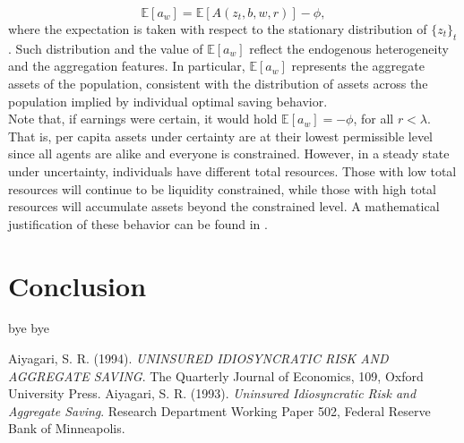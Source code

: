 \documentclass[12pt]{article}
\begin{document}
\begin{equation}
\mathbb E\left[a_w \right] = \mathbb E \left[A(z_t, b, w, r)\right] - \phi,
\end{equation}
where the expectation is taken with respect to the stationary distribution of $\{z_t\}_t$. Such distribution and the value of $\mathbb E\left[a_w \right]$ reflect the endogenous heterogeneity and the aggregation features. In particular, $\mathbb E\left[a_w \right]$ represents the aggregate assets of the population, consistent with the distribution of assets across the population implied by individual optimal saving behavior. \\
Note that, if earnings were certain, it would hold $\mathbb E\left[a_w \right] = -\phi$, for all $r < \lambda$. That is, per capita assets under certainty are at their lowest permissible level since all agents are alike and everyone is constrained. However, in a steady state under uncertainty, individuals have different total resources. Those with low total resources will continue to be liquidity constrained, while those with high total resources will accumulate assets beyond the constrained level. A mathematical justification of these behavior can be found in \cite{aiya94}.

\section{Conclusion}
bye bye


\newpage
\begin{thebibliography}{99}
 {\sc Aiyagari, S. R.} (1994). \textit{UNINSURED IDIOSYNCRATIC RISK AND AGGREGATE SAVING}. The Quarterly Journal of Economics, 109, Oxford University Press.
 {\sc Aiyagari, S. R.} (1993). \textit{Uninsured Idiosyncratic Risk and Aggregate Saving}. Research Department Working Paper 502, Federal Reserve Bank of Minneapolis.
\end{thebibliography}
\end{document}
